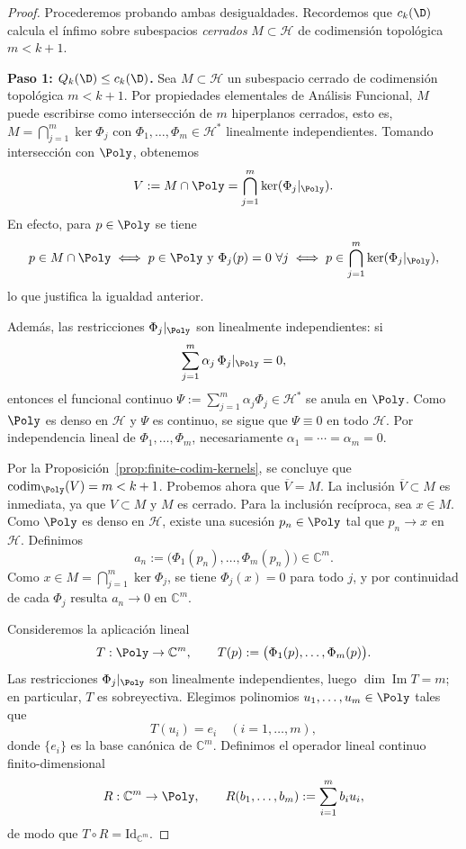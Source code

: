 \begin{proof}
	Procederemos probando ambas desigualdades. Recordemos que $c_k(\D)$ calcula el ínfimo sobre subespacios \textit{cerrados} $M \subset \mathcal{H}$ de codimensión topológica $m < k+1$.

	\textbf{Paso 1: $Q_k(\D) \le c_k(\D)$.}
	Sea $M \subset \mathcal{H}$ un subespacio cerrado de codimensión topológica $m < k+1$. Por propiedades elementales de Análisis Funcional, $M$ puede escribirse como intersección de $m$ hiperplanos cerrados, esto es, $M=\bigcap_{j=1}^m\ker\Phi_j$ con $\Phi_1,\dots,\Phi_m\in\mathcal{H}^*$ linealmente independientes. Tomando intersección con $\Poly$, obtenemos
	\[
		V:=M\cap\Poly=\bigcap_{j=1}^m\ker(\Phi_j|_{\Poly}).
	\]
	En efecto, para $p\in\Poly$ se tiene
	\[
		p\in M\cap\Poly
		\iff p\in\Poly\ \text{y}\ \Phi_j(p)=0\ \forall j
		\iff p\in\bigcap_{j=1}^m\ker(\Phi_j|_{\Poly}),
	\]
	lo que justifica la igualdad anterior.

	Además, las restricciones $\Phi_j|_{\Poly}$ son linealmente independientes: si
	\[
		\sum_{j=1}^m \alpha_j\,\Phi_j|_{\Poly}=0,
	\]
	entonces el funcional continuo $\Psi:=\sum_{j=1}^m \alpha_j\Phi_j\in\mathcal{H}^*$ se anula en $\Poly$. Como $\Poly$ es denso en $\mathcal{H}$ y $\Psi$ es continuo, se sigue que $\Psi\equiv 0$ en todo $\mathcal{H}$. Por independencia lineal de $\Phi_1,\dots,\Phi_m$, necesariamente $\alpha_1=\cdots=\alpha_m=0$.

	Por la Proposición~\ref{prop:finite-codim-kernels}, se concluye que $\operatorname{codim}_{\Poly}(V)=m<k+1$.
	Probemos ahora que $\overline V=M$. La inclusión $\overline V\subset M$ es inmediata, ya que $V\subset M$ y $M$ es cerrado. Para la inclusión recíproca, sea $x\in M$. Como $\Poly$ es denso en $\mathcal H$, existe una sucesión $p_n\in \Poly$ tal que $p_n\to x$ en $\mathcal H$. Definimos
	\[
		a_n:=\bigl(\Phi_1(p_n),\dots,\Phi_m(p_n)\bigr)\in\mathbb C^m.
	\]
	Como $x\in M=\bigcap_{j=1}^m\ker\Phi_j$, se tiene $\Phi_j(x)=0$ para todo $j$, y por continuidad de cada $\Phi_j$ resulta $a_n\to 0$ en $\mathbb C^m$.

	Consideremos la aplicación lineal
	\[
		T:\Poly\to\mathbb C^m,\qquad T(p):=\bigl(\Phi_1(p),\dots,\Phi_m(p)\bigr).
	\]
	Las restricciones $\Phi_j|_{\Poly}$ son linealmente independientes, luego $\dim\operatorname{Im}T=m$; en particular, $T$ es sobreyectiva. Elegimos polinomios $u_1,\dots,u_m\in\Poly$ tales que
	\[
		T(u_i)=e_i\quad (i=1,\dots,m),
	\]
	donde $\{e_i\}$ es la base canónica de $\mathbb C^m$. Definimos el operador lineal continuo finito-dimensional
	\[
		R:\mathbb C^m\to\Poly,\qquad R(b_1,\dots,b_m):=\sum_{i=1}^m b_i u_i,
	\]
	de modo que $T\circ R=\mathrm{Id}_{\mathbb C^m}$.


\end{proof}

